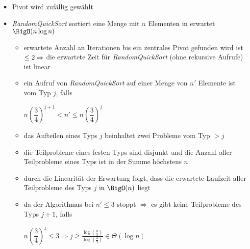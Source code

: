 \vspace*{-0.5\baselineskip}\begin{itemize}[itemsep=-1pt]
	\item Pivot wird zufällig gewählt
	\item \textit{RandomQuickSort} sortiert eine Menge mit $n$ Elementen in erwartet $\BigO(n\log n)$
		\vspace*{-1.5\baselineskip}\Proof\up
			\begin{itemize}[itemsep=-1pt]
				\item erwartete Anzahl an Iterationen bis ein zentrales Pivot gefunden wird ist $\leq 2\\
				\Rightarrow$ die erwartete Zeit für \textit{RandomQuickSort} (ohne rekursive Aufrufe) ist linear
				\item ein Aufruf von \textit{RandomQuickSort} auf einer Menge von $n'$ Elemente ist vom Typ $j$, falls
					\begin{center}
						$n\left(\dfrac{3}{4}\right)^{j+1}< n' \leq n\left(\dfrac{3}{4}\right)^j$
					\end{center}
				\item das Aufteilen eines Typs $j$ beinhaltet zwei Probleme vom Typ $>j$
				\item die Teilprobleme eines festen Typs sind disjunkt und die Anzahl aller Teilprobleme eines Typs ist in der Summe höchstens $n$
				\item durch die Linearität der Erwartung folgt, dass die erwartete Laufzeit aller Teilprobleme des Typs $j$ in $\BigO(n)$ liegt
				\item da der Algorithmus bei $n'\leq 3$ stoppt $\Rightarrow$ es gibt keine Teilprobleme des Typs $j+1$, falls
					\begin{center}
						$n\left(\dfrac{3}{4}\right)^j\leq 3 \Rightarrow j \geq \frac{\log(\frac{n}{3})}{\log(\frac{3}{4})}\in \Theta(\log n)$
					\end{center}
			\end{itemize}
\end{itemize}